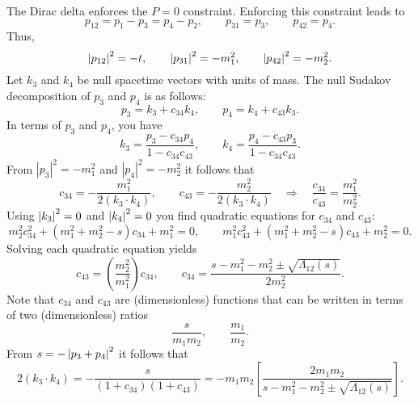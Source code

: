 The Dirac delta enforces the $P = 0$ constraint. Enforcing this constraint leads to
\begin{equation}
	p_{12} = p_{1} - p_{3} = p_{4} - p_{2}, \qquad p_{31} = p_{3}, \qquad p_{42} = p_{4}.
\end{equation}
Thus,
\begin{equation}
	\left\lvert p_{12} \right\rvert^{2} = -t, \qquad \left\lvert p_{31} \right\rvert^{2} = -m_{1}^{2}, \qquad \left\lvert p_{42} \right\rvert^{2} = -m_{2}^{2}.
\end{equation}
Let $k_{3}$ and $k_{4}$ be null spacetime vectors with units of mass. The null Sudakov decomposition of $p_{3}$ and $p_{4}$ is as follows:
\begin{equation}
	p_{3} = k_{3} + c_{34} k_{4}, \qquad p_{4} = k_{4} + c_{43} k_{3}.
\end{equation}
In terms of $p_{3}$ and $p_{4}$, you have
\begin{equation}
	k_{3} = \frac{p_{3} - c_{34} p_{4}}{1 - c_{34} c_{43}}, \qquad k_{4} = \frac{p_{4} - c_{43} p_{3}}{1 - c_{34} c_{43}}.
	\label{eq:k1_and_k2}
\end{equation}
From $|p_{3}|^{2} = -m_{1}^{2}$ and $|p_{4}|^{2} = -m_{2}^{2}$ it follows that
\begin{equation}
	c_{34} = - \frac{m_{1}^{2}}{2 (k_{3} \cdot k_{4})}, \qquad c_{43} = - \frac{m_{2}^{2}}{2 (k_{3} \cdot k_{4})} \quad \Longrightarrow \quad \frac{c_{34}}{c_{43}} = \frac{m_{1}^{2}}{m_{2}^{2}}.
\end{equation}
Using $\left\lvert k_{3} \right\rvert^{2} = 0$ and $\left\lvert k_{4} \right\rvert^{2} = 0$ you find quadratic equations for $c_{34}$ and $c_{43}$:
\begin{equation}
	m_{2}^{2} c_{34}^{2} + \left(m_{1}^{2} + m_{2}^{2} - s\right) c_{34} + m_{1}^{2} = 0, \qquad m_{1}^{2} c_{43}^{2} + \left(m_{1}^{2} + m_{2}^{2} - s\right) c_{43} + m_{2}^{2} = 0.
\end{equation}
Solving each quadratic equation yields
\begin{equation}
	c_{43} = \left( \frac{m_{2}^{2}}{m_{1}^{2}} \right) c_{34}, \qquad c_{34} = \frac{s - m_{1}^{2} - m_{2}^{2} \pm \sqrt{\Lambda_{12}(s)}}{2 m_{2}^{2}}.
\end{equation}
Note that $c_{34}$ and $c_{43}$ are (dimensionless) functions that can be written in terms of two (dimensionless) ratios
\begin{equation}
	\frac{s}{m_{1} m_{2}}, \qquad \frac{m_{1}}{m_{2}}.
\end{equation}
From $s = {-\left\lvert p_{3} + p_{4} \right\rvert^{2}}$ it follows that
\begin{equation}
	2 (k_{3} \cdot k_{4}) = - \frac{s}{(1 + c_{34})(1 + c_{43})} = -m_{1} m_{2} \left[ \frac{2 m_{1} m_{2}}{s - m_{1}^{2} - m_{2}^{2} \pm \sqrt{\Lambda_{12}(s)}} \right].
\end{equation}
